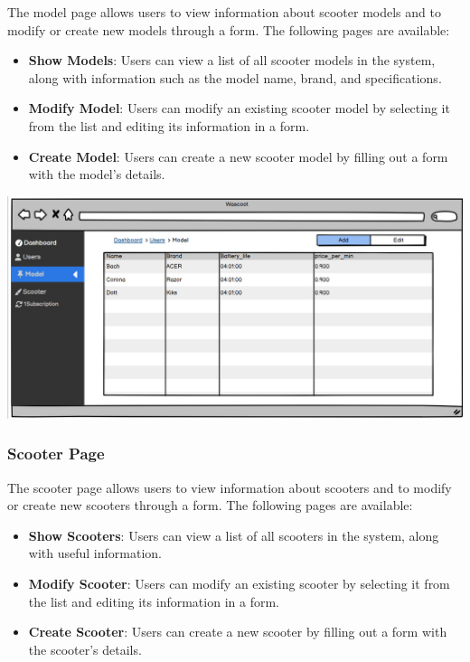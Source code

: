 The model page allows users to view information about scooter models and to modify or create new models through a form. The following pages are available:

\begin{itemize}
\item \textbf{Show Models}: Users can view a list of all scooter models in the system, along with information such as the model name, brand, and specifications.
\item \textbf{Modify Model}: Users can modify an existing scooter model by selecting it from the list and editing its information in a form.
\item \textbf{Create Model}: Users can create a new scooter model by filling out a form with the model's details.
\end{itemize}

\includegraphics[scale = 0.7]{sections/DLL/Model.png}

\subsubsection{Scooter Page}

The scooter page allows users to view information about scooters and to modify or create new scooters through a form. The following pages are available:

\begin{itemize}
\item \textbf{Show Scooters}: Users can view a list of all scooters in the system, along with useful information.
\item \textbf{Modify Scooter}: Users can modify an existing scooter by selecting it from the list and editing its information in a form.
\item \textbf{Create Scooter}: Users can create a new scooter by filling out a form with the scooter's details.
\end{itemize}

